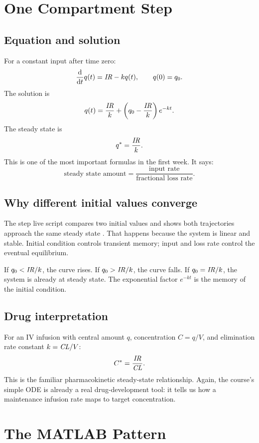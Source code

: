 \documentclass[a4paper]{article}
\newcommand{\ddt}{\frac{\dd}{\dd t}}
\newcommand{\CL}{\ensuremath{\pksym{CL}}}
\newcommand{\IRate}{\ensuremath{\pksym{IR}}}
\begin{document}
\section{One Compartment Step}

\subsection{Equation and solution}

For a constant input after time zero:
\[
  \ddt q(t)=\IRate-kq(t),\qquad q(0)=q_0.
\]
The solution is
\[
  q(t)=\frac{\IRate}{k}
  +
  \left(q_0-\frac{\IRate}{k}\right)e^{-kt}.
\]
The steady state is
\[
  q^*=\frac{\IRate}{k}.
\]
This is one of the most important formulas in the first week. It says:
\[
  \text{steady state amount}
  =
  \frac{\text{input rate}}{\text{fractional loss rate}}.
\]

\subsection{Why different initial values converge}

The step live script compares two initial values and shows both trajectories approach the same steady state \cite{bmeg671MatlabStep2025}. That happens because the system is linear and stable. Initial condition controls transient memory; input and loss rate control the eventual equilibrium.

If \(q_0<\IRate/k\), the curve rises. If \(q_0>\IRate/k\), the curve falls. If \(q_0=\IRate/k\), the system is already at steady state. The exponential factor \(e^{-kt}\) is the memory of the initial condition.

\subsection{Drug interpretation}

For an IV infusion with central amount \(q\), concentration \(C=q/V\), and elimination rate constant \(k=\CL/V\):
\[
  C^*=\frac{\IRate}{\CL}.
\]
This is the familiar pharmacokinetic steady-state relationship. Again, the course's simple ODE is already a real drug-development tool: it tells us how a maintenance infusion rate maps to target concentration.

\section{The MATLAB Pattern}
\end{document}
